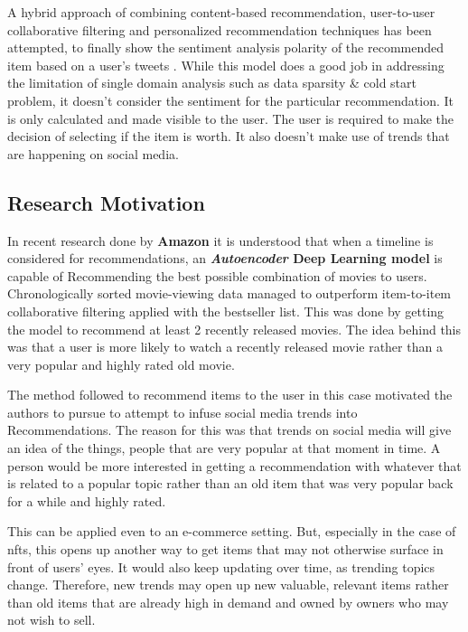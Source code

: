 \documentclass[manuscript,natbib=false]{acmart}
\begin{document}
A hybrid approach of combining content-based recommendation, user-to-user collaborative filtering and personalized recommendation techniques has been attempted, to finally show the sentiment analysis polarity of the recommended item based on a user's tweets \cite{ayushiCrossDomainRecommendationModel2018}. While this model does a good job in addressing the limitation of single domain analysis such as data sparsity \& cold start problem, it doesn't consider the sentiment for the particular recommendation. It is only calculated and made visible to the user. The user is required to make the decision of selecting if the item is worth. It also doesn't make use of trends that are happening on social media.

\subsection{Research Motivation}
In recent research done by \textbf{Amazon} \cite{larryHistoryAmazonRecommendation2019} it is understood that when a timeline is considered for recommendations, an \textbf{\emph{Autoencoder} Deep Learning model} is capable of Recommending the best possible combination of movies to users. Chronologically sorted movie-viewing data managed to outperform item-to-item collaborative filtering applied with the bestseller list.
This was done by getting the model to recommend at least 2 recently released movies. The idea behind this was that a user is more likely to watch a recently released movie rather than a very popular and highly rated old movie.

The method followed to recommend items to the user in this case motivated the authors to pursue to attempt to infuse social media trends into Recommendations. The reason for this was that trends on social media will give an idea of the things, people that are very popular at that moment in time. A person would be more interested in getting a recommendation with whatever that is related to a popular topic rather than an old item that was very popular back for a while and highly rated.

This can be applied even to an e-commerce setting. But, especially in the case of \gls{nft}s, this opens up another way to get items that may not otherwise surface in front of users' eyes. It would also keep updating over time, as trending topics change.
Therefore, new trends may open up new valuable, relevant items rather than old items that are already high in demand and owned by owners who may not wish to sell.
\end{document}
